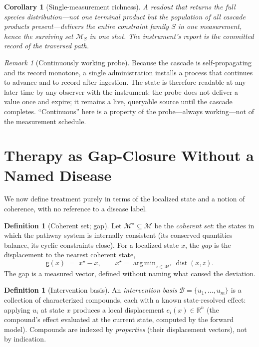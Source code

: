 \documentclass[11pt,a4paper]{article}
\theoremstyle{thmstyle}
\newtheorem{corollary}[theorem]{Corollary}
\theoremstyle{definition}
\newtheorem{definition}[theorem]{Definition}
\theoremstyle{remark}
\newtheorem{remark}[theorem]{Remark}
\newcommand{\R}{\mathbb{R}}
\newcommand{\Man}{\mathcal{M}}          %
\newcommand{\st}{x}                     %
\newcommand{\coh}{x^\star}              %
\newcommand{\gap}{\mathsf{g}}           %
\newcommand{\basis}{\mathcal{B}}        %
\newcommand{\intv}{u}                   %
\newcommand{\set}[1]{\{#1\}}
\DeclareMathOperator*{\argmin}{arg\,min}
\DeclareMathOperator{\dist}{dist}
\begin{document}
\begin{corollary}[Single-measurement richness]
\label{cor:single}
A readout that returns the full species distribution---not one terminal
product but the population of all cascade products present---delivers the
entire constraint family $S$ in one measurement, hence the surviving set
$\Man_S$ in one shot. The instrument's report \emph{is} the committed
record of the traversed path.
\end{corollary}

\begin{remark}[Continuously working probe]
\label{rem:continuous}
Because the cascade is self-propagating and its record monotone, a single
administration installs a process that continues to advance and to record
after ingestion. The state is therefore readable at any later time by any
observer with the instrument: the probe does not deliver a value once and
expire; it remains a live, queryable source until the cascade completes.
``Continuous'' here is a property of the probe---always working---not of the
measurement schedule.
\end{remark}

\section{Therapy as Gap-Closure Without a Named Disease}
\label{sec:therapy}

We now define treatment purely in terms of the localized state and a
notion of coherence, with no reference to a disease label.

\begin{definition}[Coherent set; gap]
\label{def:coherent}
Let $\Man^\star\subseteq\Man$ be the \emph{coherent set}: the states in
which the pathway system is internally consistent (its conserved
quantities balance, its cyclic constraints close). For a localized state
$\st$, the \emph{gap} is the displacement to the nearest coherent state,
\[
\gap(\st)\;=\;\coh-\st,\qquad
\coh=\argmin_{z\in\Man^\star}\dist(\st,z).
\]
The gap is a measured vector, defined without naming what caused the
deviation.
\end{definition}

\begin{definition}[Intervention basis]
\label{def:basis}
An \emph{intervention basis} $\basis=\set{\intv_1,\dots,\intv_m}$ is a
collection of characterized compounds, each with a known state-resolved
effect: applying $\intv_i$ at state $\st$ produces a local displacement
$e_i(\st)\in\R^n$ (the compound's effect evaluated at the current state,
computed by the forward model). Compounds are indexed by \emph{properties}
(their displacement vectors), not by indication.
\end{definition}
\end{document}
